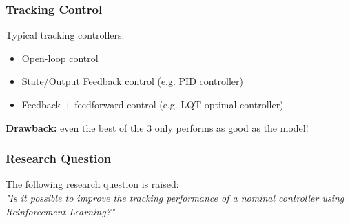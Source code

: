 \documentclass{beamer}
\begin{document}
	\begin{frame}\frametitle{Tracking Control}
		Typical tracking controllers:
		\begin{itemize}
			\item Open-loop control  \pause
			\item State/Output Feedback control (e.g. PID controller) \pause
			\item Feedback + feedforward control (e.g. LQT optimal controller) \pause
		\end{itemize}
		\pause
		\vspace{3mm}
		\textbf{Drawback:} even the best of the 3 only performs as good as the model!
	\end{frame}
	
	\begin{frame}\frametitle{Research Question}
		The following research question is raised: \\
		\vspace{5mm}
		\hspace{5mm} \textit{"Is it possible to improve the tracking performance of a nominal controller using Reinforcement Learning?"}
	\end{frame}
			
\end{document}
